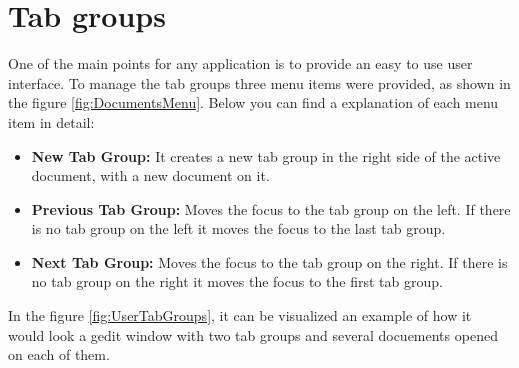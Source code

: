 
\chapter{Tab groups}

One of the main points for any \GNOME application is to provide an easy to use user interface. To manage the tab groups three menu items were provided, as shown in the figure \ref{fig:DocumentsMenu}. Below you can find a explanation of each menu item in detail:
\begin{itemize}
  \item \textbf{New Tab Group:} It creates a new tab group in the right side of the active document, with a new document on it.
  \item \textbf{Previous Tab Group:} Moves the focus to the tab group on the left. If there is no tab group on the left it moves the focus to the last tab group.
  \item \textbf{Next Tab Group:} Moves the focus to the tab group on the right. If there is no tab group on the right it moves the focus to the first tab group.
\end{itemize}


In the figure \ref{fig:UserTabGroups}, it can be visualized an example of how it would look a gedit window with two tab groups and several docuements opened on each of them.


